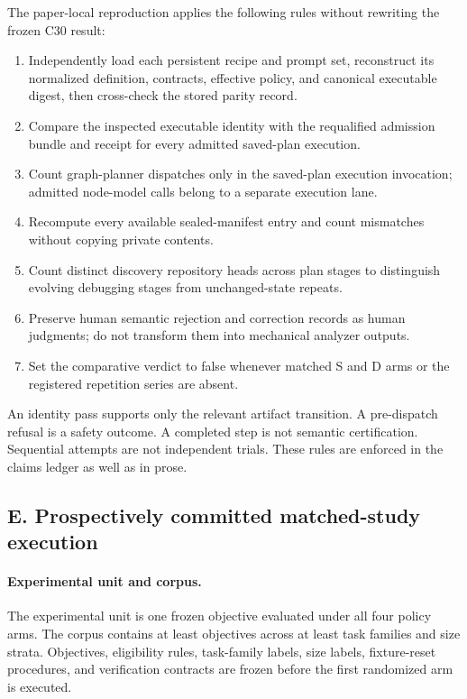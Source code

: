 \documentclass[11pt]{article}
\begin{document}
The paper-local reproduction applies the following rules without rewriting the
frozen C30 result:

\begin{enumerate}
  \item Independently load each persistent recipe and prompt set, reconstruct
  its normalized definition, contracts, effective policy, and canonical
  executable digest, then cross-check the stored parity record.
  \item Compare the inspected executable identity with the requalified
  admission bundle and receipt for every admitted saved-plan execution.
  \item Count graph-planner dispatches only in the saved-plan execution
  invocation; admitted node-model calls belong to a separate execution lane.
  \item Recompute every available sealed-manifest entry and count mismatches
  without copying private contents.
  \item Count distinct discovery repository heads across plan stages to
  distinguish evolving debugging stages from unchanged-state repeats.
  \item Preserve human semantic rejection and correction records as human
  judgments; do not transform them into mechanical analyzer outputs.
  \item Set the comparative verdict to false whenever matched S and D arms or
  the registered repetition series are absent.
\end{enumerate}

An identity pass supports only the relevant artifact transition. A
pre-dispatch refusal is a safety outcome. A completed step is not semantic
certification. Sequential attempts are not independent trials. These rules
are enforced in the claims ledger as well as in prose.

\subsection*{E. Prospectively committed matched-study execution}

\paragraph{Experimental unit and corpus.}
The experimental unit is one frozen objective evaluated under all four policy
arms. The corpus contains at least \RegisteredObjectiveMinimum{} objectives
across at least \RegisteredTaskFamilyMinimum{} task families and
\RegisteredSizeStrataMinimum{} size strata. Objectives, eligibility rules,
task-family labels, size labels, fixture-reset procedures, and verification
contracts are frozen before the first randomized arm is executed.
\end{document}
